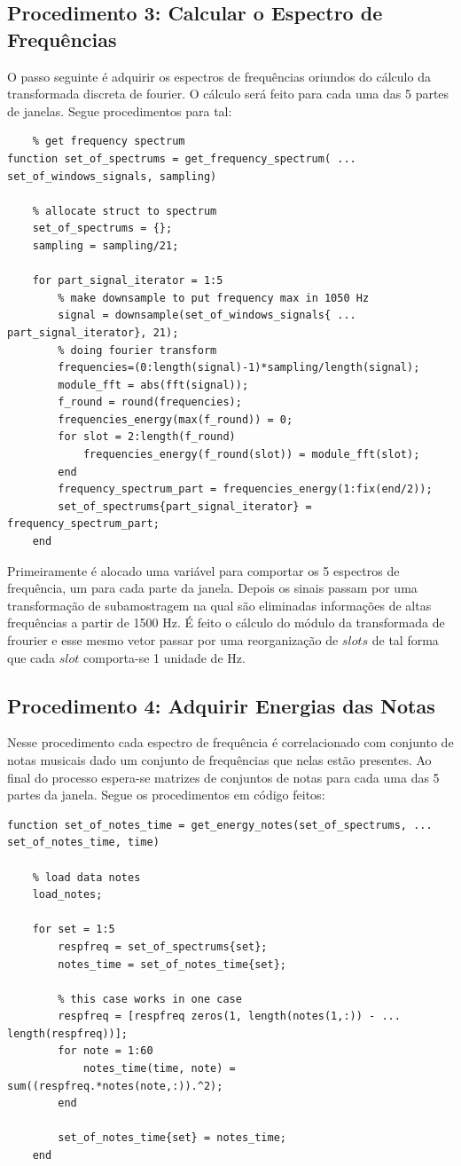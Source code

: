 \subsection{Procedimento 3: Calcular o Espectro de Frequências}

O passo seguinte é adquirir os espectros de frequências oriundos do cálculo da transformada discreta de fourier. O cálculo será feito para cada uma das 5 partes de janelas. Segue procedimentos para tal:
\begin{lstlisting}
	% get frequency spectrum
function set_of_spectrums = get_frequency_spectrum( ...
set_of_windows_signals, sampling)

    % allocate struct to spectrum
    set_of_spectrums = {};
    sampling = sampling/21;

    for part_signal_iterator = 1:5
    	% make downsample to put frequency max in 1050 Hz
        signal = downsample(set_of_windows_signals{ ...
part_signal_iterator}, 21);
        % doing fourier transform
        frequencies=(0:length(signal)-1)*sampling/length(signal);
        module_fft = abs(fft(signal));
        f_round = round(frequencies);
        frequencies_energy(max(f_round)) = 0;
        for slot = 2:length(f_round)
            frequencies_energy(f_round(slot)) = module_fft(slot);
        end
        frequency_spectrum_part = frequencies_energy(1:fix(end/2));
        set_of_spectrums{part_signal_iterator} = frequency_spectrum_part;
    end
\end{lstlisting}

Primeiramente é alocado uma variável para comportar os 5 espectros de frequência, um para cada parte da janela. Depois os sinais passam por uma transformação de subamostragem na qual são eliminadas informações de altas frequências a partir de 1500 Hz. É feito o cálculo do módulo da transformada de frourier e esse mesmo vetor passar por uma reorganização de $slots$ de tal forma que cada $slot$ comporta-se 1 unidade de Hz.

\subsection{Procedimento 4: Adquirir Energias das Notas}

Nesse procedimento cada espectro de frequência é correlacionado com conjunto de notas musicais dado um conjunto de frequências que nelas estão presentes. Ao final do processo espera-se matrizes de conjuntos de notas para cada uma das 5 partes da janela. Segue os procedimentos em código feitos:
\begin{lstlisting}
function set_of_notes_time = get_energy_notes(set_of_spectrums, ...
set_of_notes_time, time)
	
	% load data notes
	load_notes;

	for set = 1:5
		respfreq = set_of_spectrums{set};
		notes_time = set_of_notes_time{set};

		% this case works in one case
		respfreq = [respfreq zeros(1, length(notes(1,:)) - ...
length(respfreq))];
		for note = 1:60
	        notes_time(time, note) = sum((respfreq.*notes(note,:)).^2);    
		end	

		set_of_notes_time{set} = notes_time;
	end
\end{lstlisting}

